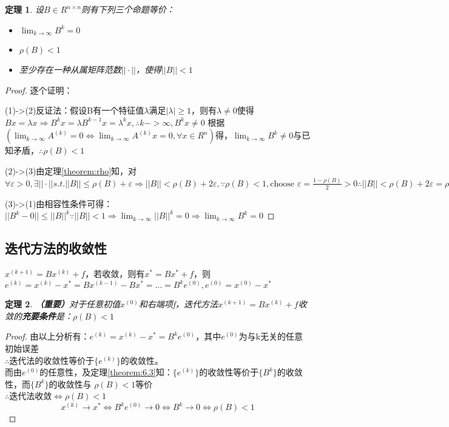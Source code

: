 \documentclass[a4paper]{article}
\newtheorem{theorem}{定理}[section]
\begin{document}
\begin{theorem}
  设$B\in R^{n\times n} $则有下列三个命题等价： 
  \begin{itemize}
    \item $\lim_{k\rightarrow \infty} B^k=0$
    \item $\rho(B)<1$
    \item 至少存在一种从属矩阵范数$||\cdot||$，使得$||B||<1$
  \end{itemize}
\end{theorem}

\begin{proof}
  逐个证明：

  (1)->(2)反证法：假设B有一个特征值$\lambda$满足$|\lambda|\ge 1$，则有$\lambda \neq 0$使得$Bx=\lambda x\Rightarrow B^kx=\lambda B^{k-1}x=\lambda^kx,\therefore k->\infty,B^kx\neq 0 $
  根据$(\lim_{k\rightarrow \infty} A^{(k)}=0\Leftrightarrow \lim_{k\rightarrow \infty} A^{(k)}x=0, \forall x \in R^n )$得，$\lim_{k\rightarrow \infty} B^{k}\neq 0$与已知矛盾，$\therefore \rho(B)<1$

  (2)->(3)由定理\ref{theorem:rho}知，对$\forall \varepsilon >0, \exists ||\cdot|| s.t. ||B||\le \rho(B)+\varepsilon \Rightarrow ||B||<\rho(B)+2\varepsilon, \because \rho(B)<1, \text{choose\ } \varepsilon = \frac{1-\rho(B)}{2}>0
  \therefore ||B||<\rho(B)+2\varepsilon = \rho(B)+2\frac{1-\rho(B)}{2}=1 $

  (3)->(1)由相容性条件可得：$||B^k-0||\le ||B||^k \because ||B||<1 \Rightarrow \lim_{k\rightarrow \infty}||B||^k=0 \Rightarrow \lim_{k\rightarrow \infty}B^k=0 $
\end{proof}

\subsection{迭代方法的收敛性}
$x^{(k+1)}=Bx^{(k)}+f $，若收敛，则有$x^*=Bx^*+f$，则$e^{(k)}=x^{(k)}-x^*=Bx^{(k-1)}-Bx^*= \dots = B^ke^{(0)}, e^{(0)}=x^{(0)}-x^* $

\begin{theorem}
  \textbf{（重要）}对于任意初值$x^{(0)} $和右端项f，迭代方法$x^{(k+1)}=Bx^{(k)}+f $收敛的\textbf{充要条件}是：$\rho(B)<1$
\end{theorem}
\begin{proof}
  由以上分析有：$e^{(k)}=x^{(k)}-x^*= B^ke^{(0)}$，其中$e^{(0)}$为与k无关的任意初始误差\\
  $\therefore$迭代法的收敛性等价于$\{e^{(k)} \}$的收敛性。\\
  而由$e^{(0)}$的任意性，及定理\ref{theorem:6.3}知：$\{e^{(k)} \}$的收敛性等价于$\{B^k\}$的收敛性，而$\{B^k\}$的收敛性与
  $\rho(B)<1$等价\\
  $\therefore$迭代法收敛$\Leftrightarrow\rho(B)<1$
  $$x^{(k)}\rightarrow x^* \Leftrightarrow B^ke^{(0)}\rightarrow 0\Leftrightarrow B^k\rightarrow 0 \Leftrightarrow \rho(B)<1 $$
\end{proof}
\end{document}
